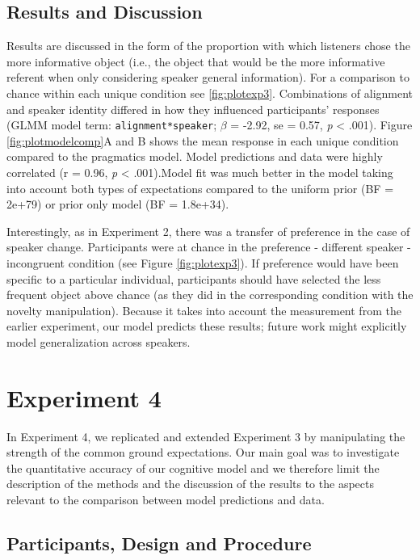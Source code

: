 \documentclass[10pt, letterpaper]{article}
\begin{document}
\subsection{Results and Discussion}\label{results-and-discussion-2}

Results are discussed in the form of the proportion with which listeners
chose the more informative object (i.e., the object that would be the
more informative referent when only considering speaker general
information). For a comparison to chance within each unique condition
see \ref{fig:plotexp3}. Combinations of alignment and speaker identity
differed in how they influenced participants' responses (GLMM model
term: \texttt{alignment*speaker}; \(\beta\) = -2.92, se = 0.57, \emph{p}
\textless{} .001). Figure \ref{fig:plotmodelcomp}A and B shows the mean
response in each unique condition compared to the pragmatics model.
Model predictions and data were highly correlated (r = 0.96, \emph{p}
\textless{} .001).Model fit was much better in the model taking into
account both types of expectations compared to the uniform prior (BF =
2e+79) or prior only model (BF = 1.8e+34).

Interestingly, as in Experiment 2, there was a transfer of preference in
the case of speaker change. Participants were at chance in the
preference - different speaker - incongruent condition (see Figure
\ref{fig:plotexp3}). If preference would have been specific to a
particular individual, participants should have selected the less
frequent object above chance (as they did in the corresponding condition
with the novelty manipulation). Because it takes into account the
measurement from the earlier experiment, our model predicts these
results; future work might explicitly model generalization across
speakers.

\section{Experiment 4}\label{experiment-4}

In Experiment 4, we replicated and extended Experiment 3 by manipulating
the strength of the common ground expectations. Our main goal was to
investigate the quantitative accuracy of our cognitive model and we
therefore limit the description of the methods and the discussion of the
results to the aspects relevant to the comparison between model
predictions and data.

\subsection{Participants, Design and
Procedure}\label{participants-design-and-procedure-3}
\end{document}
